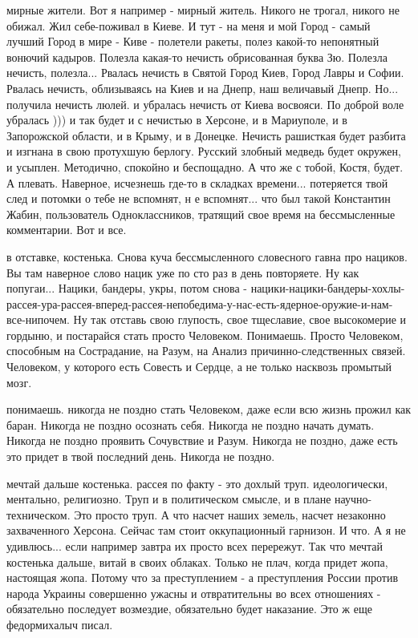 мирные жители. Вот я например - мирный житель. Никого не трогал, никого не
обижал. Жил себе-поживал в Киеве. И тут - на меня и мой Город - самый лучший
Город в мире - Киве - полетели ракеты, полез какой-то непонятный вонючий
кадыров. Полезла какая-то нечисть обрисованная буква Зю. Полезла нечисть,
полезла... Рвалась нечисть в Святой Город Киев, Город Лавры и Софии. Рвалась
нечисть, облизываясь на Киев и на Днепр, наш величавый Днепр. Но... получила
нечисть люлей. и убралась нечисть от Киева восвояси. По доброй воле убралась
))) и так будет и с нечистью в Херсоне, и в Мариуполе, и в Запорожской области,
и в Крыму, и в Донецке. Нечисть рашисткая будет разбита и изгнана в свою
протухшую берлогу. Русский злобный медведь будет окружен, и усыплен. Методично,
спокойно и беспощадно. А что же с тобой, Костя, будет. А плевать. Наверное,
исчезнешь где-то в складках времени... потеряется твой след и потомки о тебе не
вспомнят, н е вспомнят... что был такой Константин Жабин, пользователь
Одноклассников, тратящий свое время на бессмысленные комментарии. Вот и все.

в отставке, костенька. Снова куча бессмысленного словесного гавна про нациков.
Вы там наверное слово нацик уже по сто раз в день повторяете. Ну как попугаи...
Нацики, бандеры, укры, потом снова -
нацики-нацики-бандеры-хохлы-рассея-ура-рассея-вперед-рассея-непобедима-у-нас-есть-ядерное-оружие-и-нам-все-нипочем.
Ну так отставь свою глупость, свое тщеславие, свое высокомерие и гордыню, и
постарайся стать просто Человеком. Понимаешь. Просто Человеком, способным на
Сострадание, на Разум, на Анализ причинно-следственных связей. Человеком, у
которого есть Совесть и Сердце, а не только насквозь промытый мозг.

понимаешь. никогда не поздно стать Человеком, даже если всю жизнь прожил как
баран. Никогда не поздно осознать себя. Никогда не поздно начать думать.
Никогда не поздно проявить Сочувствие и Разум. Никогда не поздно, даже есть это
придет в твой последний день. Никогда не поздно.

мечтай дальше костенька. рассея по факту - это дохлый труп. идеологически,
ментально, религиозно. Труп и в политическом смысле, и в плане
научно-техническом. Это просто труп. А что насчет наших земель, насчет
незаконно захваченного Херсона. Сейчас там стоит оккупационный гарнизон. И что.
А я не удивлюсь... если например завтра их просто всех перережут. Так что
мечтай костенька дальше, витай в своих облаках. Только не плач, когда придет
жопа, настоящая жопа. Потому что за преступлением - а преступления России
против народа Украины совершенно ужасны и отвратительны во всех отношениях -
обязательно последует возмездие, обязательно будет наказание. Это ж еще
федормихалыч писал.

